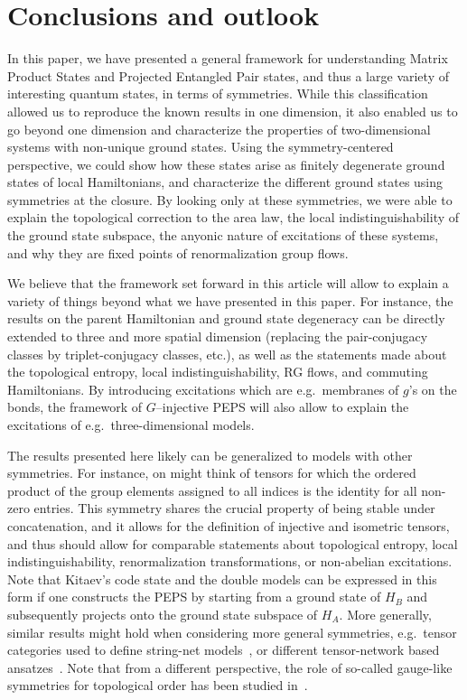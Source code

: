 \documentclass{article}
\theoremstyle{plain}
\theoremstyle{definition}
\numberwithin{equation}{section}  %
\begin{document}
\section{Conclusions and outlook\label{sec:conclusion}}

In this paper, we have presented a general framework for understanding
Matrix Product States and Projected Entangled Pair states, and thus a
large variety of interesting quantum states, in terms of symmetries. While this
classification allowed us to reproduce the known results in one dimension,
it also enabled us to go beyond one dimension and characterize the
properties of two-dimensional systems with non-unique ground states. Using
the symmetry-centered perspective, we could show how these states arise as
finitely degenerate ground states of local Hamiltonians, and characterize
the different ground states using symmetries at the closure. By looking
only at these symmetries, we were able to explain the topological
correction to the area law, the local indistinguishability of the ground
state subspace, the anyonic nature of excitations of these systems, and
why they are fixed points of renormalization group flows.

We believe that the framework set forward in this article will allow to
explain a variety of things beyond what we have presented in this
paper. For instance, the results on the parent Hamiltonian and
ground state degeneracy can be directly extended to three and more spatial
dimension (replacing the pair-conjugacy classes by triplet-conjugacy
classes, etc.), as well as the statements made about the topological entropy,
local indistinguishability, RG flows, and commuting Hamiltonians. By
introducing excitations which are e.g.\ membranes of $g$'s on the bonds,
the framework of $G$--injective PEPS will also allow to explain the
excitations of e.g.\ three-dimensional models.

The results presented here likely can be generalized to models with other
symmetries. For instance, on might think of tensors for which the ordered
product of the group elements assigned to all indices is the identity for
all non-zero entries. This symmetry shares the crucial property of being
stable under concatenation, and it allows for the definition of injective
and isometric tensors, and thus should allow for comparable statements
about topological entropy, local indistinguishability, renormalization
transformations, or non-abelian excitations.  Note that Kitaev's code
state and the double models can be expressed in this form if one
constructs the PEPS by starting from a ground state of $H_B$ and
subsequently projects onto the ground state subspace of $H_A$. More
generally, similar results might hold when considering more general
symmetries,  e.g.\ tensor categories used to define string-net
models~\cite{levin-wen:string-net-models}, or different tensor-network
based ansatzes~\cite{sierra:2d-dmrg,nishino:tps}.  Note that from a
different perspective, the role of so-called gauge-like symmetries for
topological order has been studied
in~\cite{nussinov:symmetry-topology-prl,nussinov:symmetry-topology-long}.
\end{document}
